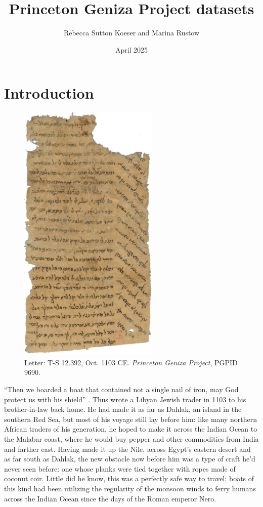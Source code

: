 \documentclass{article}
\title{Princeton Geniza Project datasets}
\author{Rebecca Sutton Koeser and Marina Rustow}
\date{April 2025}
\begin{document}
\maketitle

\section{Introduction}

\begin{figure}[h!]
  \includegraphics[height=5in]{PGPID 9690_T-S_12.392r.png}
  \centering
  \caption{Letter: T-S 12.392, Oct. 1103 CE. \textit{Princeton Geniza Project}, PGPID 9690.}
  \label{fig:pgpid9690}
\end{figure}


“Then we boarded a boat that contained not a single nail of iron, may God protect us with his shield” \autocite{noauthor_letter_1103}. Thus wrote a Libyan Jewish trader in 1103 to his brother-in-law back home. He had made it as far as Dahlak, an island in the southern Red Sea, but most of his voyage still lay before him: like many northern African traders of his generation, he hoped to make it across the Indian Ocean to the Malabar coast, where he would buy pepper and other commodities from India and farther east. Having made it up the Nile, across Egypt’s eastern desert and as far south as Dahlak, the new obstacle now before him was a type of craft he’d never seen before: one whose planks were tied together with ropes made of coconut coir. Little did he know, this was a perfectly safe way to travel; boats of this kind had been utilizing the regularity of the monsoon winds to ferry humans across the Indian Ocean since the days of the Roman emperor Nero.
\end{document}
